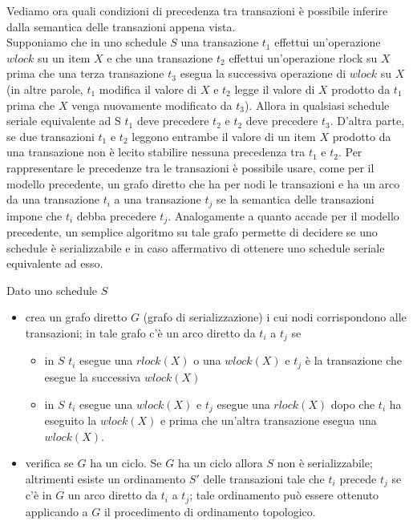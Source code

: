 Vediamo ora quali condizioni di precedenza tra transazioni è possibile inferire dalla semantica delle
transazioni appena vista.\\
Supponiamo che in uno schedule $S$ una transazione $t_1$ effettui un'operazione $wlock$ su un item $X$ e
che una transazione $t_2$ effettui un'operazione rlock su $X$ prima che una terza transazione $t_3$ esegua
la successiva operazione di $wlock$ su $X$ (in altre parole, $t_1$ modifica il valore di $X$ e $t_2$ legge il
valore di $X$ prodotto da $t_1$ prima che $X$ venga nuovamente modificato da $t_3$). Allora in qualsiasi
schedule seriale equivalente ad S $t_1$ deve precedere $t_2$ e $t_2$ deve precedere $t_3$. D'altra parte, se due
transazioni $t_1$ e $t_2$ leggono entrambe il valore di un item $X$ prodotto da una transazione non è lecito
stabilire nessuna precedenza tra $t_1$ e $t_2$.
Per rappresentare le precedenze tra le transazioni è possibile usare, come per il modello precedente,
un grafo diretto che ha per nodi le transazioni e ha un arco da una transazione $t_i$ a una transazione
$t_j$ se la semantica delle transazioni impone che $t_i$ debba precedere $t_j$. Analogamente a quanto
accade per il modello precedente, un semplice algoritmo su tale grafo permette di decidere se uno
schedule è serializzabile e in caso affermativo di ottenere uno schedule seriale equivalente ad esso.

\begin{alg}
Dato uno schedule $S$
\begin{itemize}
 \item crea un grafo diretto $G$ (grafo di serializzazione) i cui nodi corrispondono alle transazioni; in
tale grafo c'è un arco diretto da $t_i$ a $t_j$ se
 \begin{itemize}
  \item in $S$ $t_i$ esegue una $rlock(X)$ o una $wlock(X)$ e $t_j$ è la transazione che esegue la successiva
   $wlock(X)$
  \item in $S$ $t_i$ esegue una $wlock(X)$ e $t_j$ esegue una $rlock(X)$ dopo che $t_i$ ha eseguito la $wlock(X)$ e
prima che un'altra transazione esegua una $wlock(X)$.
 \end{itemize}
\item verifica se $G$ ha un ciclo. Se $G$ ha un ciclo allora $S$ non è serializzabile; altrimenti esiste un
ordinamento $S'$ delle transazioni tale che $t_i$ precede $t_j$ se c'è in $G$ un arco diretto da $t_i$ a $t_j$; tale
ordinamento può essere ottenuto applicando a $G$ il procedimento di ordinamento topologico.
\end{itemize}
\end{alg}

